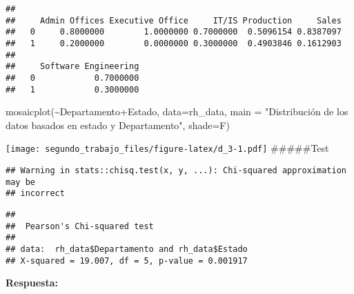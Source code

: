 \documentclass[
]{article}
\newenvironment{Shaded}{\begin{snugshade}}{\end{snugshade}}
\newcommand{\AttributeTok}[1]{\textcolor[rgb]{0.77,0.63,0.00}{#1}}
\newcommand{\DecValTok}[1]{\textcolor[rgb]{0.00,0.00,0.81}{#1}}
\newcommand{\FunctionTok}[1]{\textcolor[rgb]{0.00,0.00,0.00}{#1}}
\newcommand{\NormalTok}[1]{#1}
\newcommand{\SpecialCharTok}[1]{\textcolor[rgb]{0.00,0.00,0.00}{#1}}
\newcommand{\StringTok}[1]{\textcolor[rgb]{0.31,0.60,0.02}{#1}}
\begin{document}
\begin{Shaded}
\end{Shaded}

\begin{verbatim}
##    
##     Admin Offices Executive Office     IT/IS Production     Sales
##   0     0.8000000        1.0000000 0.7000000  0.5096154 0.8387097
##   1     0.2000000        0.0000000 0.3000000  0.4903846 0.1612903
##    
##     Software Engineering
##   0            0.7000000
##   1            0.3000000
\end{verbatim}

\begin{Shaded}
\begin{Highlighting}[]
\FunctionTok{mosaicplot}\NormalTok{(}\SpecialCharTok{\textasciitilde{}}\NormalTok{Departamento}\SpecialCharTok{+}\NormalTok{Estado, }\AttributeTok{data=}\NormalTok{rh\_data,  }\AttributeTok{main =} \StringTok{"Distribución de los datos basados en estado y Departamento"}\NormalTok{, }\AttributeTok{shade=}\NormalTok{F)}
\end{Highlighting}
\end{Shaded}

\texttt{[image: segundo\_trabajo\_files/figure-latex/d\_3-1.pdf]}
\#\#\#\#\#Test

\begin{Shaded}
\end{Shaded}

\begin{verbatim}
## Warning in stats::chisq.test(x, y, ...): Chi-squared approximation may be
## incorrect
\end{verbatim}

\begin{verbatim}
## 
##  Pearson's Chi-squared test
## 
## data:  rh_data$Departamento and rh_data$Estado
## X-squared = 19.007, df = 5, p-value = 0.001917
\end{verbatim}

\textbf{Respuesta:}
\end{document}
